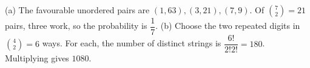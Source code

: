 (a) The favourable unordered pairs are $(1,63),(3,21),(7,9)$. Of $\binom72=21$ pairs, three work, so the probability is $\boxed{\dfrac{1}{7}}$.
(b) Choose the two repeated digits in $\binom42=6$ ways. For each, the number of distinct strings is $\dfrac{6!}{2!2!}=180$. Multiplying gives $\boxed{1080}$.
